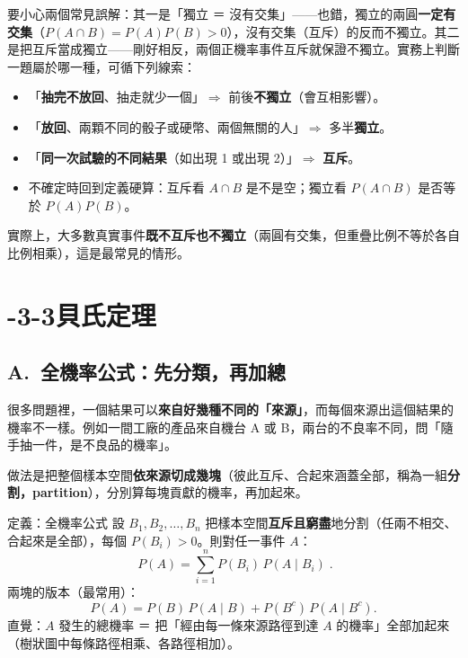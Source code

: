 \documentclass[11pt]{article}
\begin{document}
要小心兩個常見誤解：其一是「獨立 ＝ 沒有交集」——也錯，獨立的兩圓\textbf{一定有交集}（$P(A\cap B)=P(A)P(B)>0$），沒有交集（互斥）的反而不獨立。其二是把互斥當成獨立——剛好相反，兩個正機率事件互斥就保證不獨立。實務上判斷一題屬於哪一種，可循下列線索：

\begin{itemize}\setlength{\itemsep}{1pt}
\item 「\textbf{抽完不放回}、抽走就少一個」$\Rightarrow$ 前後\textbf{不獨立}（會互相影響）。
\item 「\textbf{放回}、兩顆不同的骰子或硬幣、兩個無關的人」$\Rightarrow$ 多半\textbf{獨立}。
\item 「\textbf{同一次試驗的不同結果}（如出現 1 或出現 2）」$\Rightarrow$ \textbf{互斥}。
\item 不確定時回到定義硬算：互斥看 $A\cap B$ 是不是空；獨立看 $P(A\cap B)$ 是否等於 $P(A)P(B)$。
\end{itemize}

實際上，大多數真實事件\textbf{既不互斥也不獨立}（兩圓有交集，但重疊比例不等於各自比例相乘），這是最常見的情形。

\section*{-3-3\quad 貝氏定理}

\subsection*{\sffamily A.\ 全機率公式：先分類，再加總}

很多問題裡，一個結果可以\textbf{來自好幾種不同的「來源」}，而每個來源出這個結果的機率不一樣。例如一間工廠的產品來自機台 A 或 B，兩台的不良率不同，問「隨手抽一件，是不良品的機率」。

做法是把整個樣本空間\textbf{依來源切成幾塊}（彼此互斥、合起來涵蓋全部，稱為一組\textbf{分割，partition}），分別算每塊貢獻的機率，再加起來。

\begin{補充框}{定義：全機率公式}
設 $B_1,B_2,\dots,B_n$ 把樣本空間\textbf{互斥且窮盡}地分割（任兩不相交、合起來是全部），每個 $P(B_i)>0$。則對任一事件 $A$：
$$\boxed{\;P(A)=\sum_{i=1}^{n}P(B_i)\,P(A\mid B_i)\;}.$$
兩塊的版本（最常用）：
$$P(A)=P(B)\,P(A\mid B)+P(B^c)\,P(A\mid B^c).$$
直覺：$A$ 發生的總機率 ＝ 把「經由每一條來源路徑到達 $A$ 的機率」全部加起來（樹狀圖中每條路徑相乘、各路徑相加）。
\end{補充框}

\end{document}
